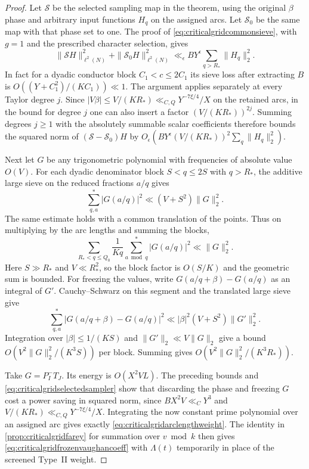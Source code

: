 \documentclass[11pt,a4paper]{article}
\numberwithin{equation}{section}
\begin{document}
\begin{proof}
Let $\mathcal S$ be the selected sampling map in the
theorem, using the original $\beta$ phase and arbitrary
input functions $H_q$ on the assigned arcs. Let
$\mathcal S_0$ be the same map with that phase set to one.
The proof of \cref{eq:criticalgridcommonsieve}, with $g=1$
and the prescribed character selection, gives
\begin{equation}
 \|\mathcal S H\|_{\ell^2(N)}^2+
 \|\mathcal S_0 H\|_{\ell^2(N)}^2
   \ll_\epsilon BY^\epsilon\sum_{q>R_*}\|H_q\|_2^2 .
 \label{eq:criticalgridselectedsampler}
\end{equation}
In fact for a dyadic conductor block $C_1<c\le2C_1$
its sieve loss after extracting $B$ is
$O((Y+C_1^2)/(K C_1))\ll1$.
The argument applies separately at every Taylor degree $j$.
Since $|V\beta|\le V/(K R_*)\ll_{C,Q}Y^{-7\xi/4}/X$
on the retained arcs, in the bound for degree $j$ one
can also insert a factor $(V/(K R_*))^{2j}$.
Summing degrees $j\ge1$ with the absolutely summable scalar
coefficients therefore bounds the squared norm of
$(\mathcal S-\mathcal S_0)H$ by
$O_\epsilon(BY^\epsilon (V/(K R_*))^2\sum_q\|H_q\|_2^2)$.

Next let $G$ be any trigonometric polynomial with
frequencies of absolute value $O(V)$. For each dyadic
denominator block $S<q\le2S$ with $q>R_*$, the additive
large sieve on the reduced fractions $a/q$ gives
\[
 \sum_{q,a}^* |G(a/q)|^2\ll (V+S^2)\|G\|_2^2.
\]
The same estimate holds with a common translation of the
points. Thus on multiplying by the arc lengths and summing
the blocks,
\begin{equation}
 \sum_{R_*<q\le Q_0}\frac{1}{Kq}
              \sum_{a\bmod q}^*|G(a/q)|^2\ll\|G\|_2^2 .
 \label{eq:criticalgridfrozendiscreteenergy}
\end{equation}
Here $S\gg R_*$ and $V\ll R_*^2$, so the block factor
is $O(S/K)$ and the geometric sum is bounded.
For freezing the values, write $G(a/q+\beta)-G(a/q)$
as an integral of $G'$. Cauchy--Schwarz on this segment
and the translated large sieve give
\[
 \sum_{q,a}^* |G(a/q+\beta)-G(a/q)|^2
       \ll |\beta|^2 (V+S^2)\|G'\|_2^2 .
\]
Integration over $|\beta|\le1/(KS)$ and
$\|G'\|_2\ll V\|G\|_2$ give a bound
$O(V^2\|G\|_2^2/(K^3 S))$ per block.
Summing gives $O(V^2\|G\|_2^2/(K^3 R_*))$.

Take $G=P_I^- T_J$. Its energy is $O(X^2 V L)$.
The preceding bounds and \cref{eq:criticalgridselectedsampler}
show that discarding the phase and freezing $G$ cost a
power saving in squared norm, since $BX^2V\ll_C Y^3$ and
$V/(K R_*)\ll_{C,Q}Y^{-7\xi/4}/X$.
Integrating the now constant prime polynomial over an
assigned arc gives exactly \cref{eq:criticalgridarclengthweight}.
The identity in \cref{prop:criticalgridfarey} for summation
over $v\bmod k$ then gives
\cref{eq:criticalgridfrozenvaughancoeff} with $\Lambda(t)$
temporarily in place of the screened Type~II weight.


\end{proof}
\end{document}
